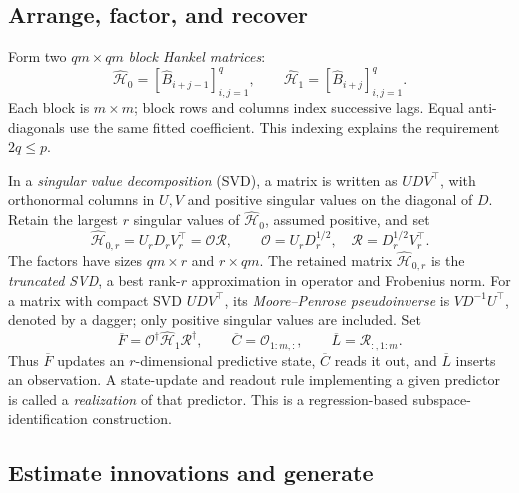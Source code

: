 \documentclass[11pt,twoside]{article}
\theoremstyle{definition}
\theoremstyle{remark}
\begin{document}
\subsection{Arrange, factor, and recover}
\label{sec:hankel}

Form two \(qm\times qm\) \emph{block Hankel matrices}:
\begin{equation}
 \widehat{\mathcal H}_0=[\widehat B_{i+j-1}]_{i,j=1}^q,\qquad
 \widehat{\mathcal H}_1=[\widehat B_{i+j}]_{i,j=1}^q .
 \label{eq:estimated-hankel}
\end{equation}
Each block is \(m\times m\); block rows and columns index successive
lags. Equal anti-diagonals use the same fitted coefficient.
This indexing explains the requirement \(2q\le p\).

In a \emph{singular value decomposition} (SVD), a matrix is written as
\(UDV^\top\), with orthonormal columns in \(U,V\) and positive singular
values on the diagonal of \(D\). Retain the largest \(r\) singular values
of \(\widehat{\mathcal H}_0\), assumed positive, and set
\[
 \widehat{\mathcal H}_{0,r}=U_rD_rV_r^\top
   =\mathcal O\mathcal R,\qquad
 \mathcal O=U_rD_r^{1/2},\quad
 \mathcal R=D_r^{1/2}V_r^\top .
\]
The factors have sizes \(qm\times r\) and \(r\times qm\).
The retained matrix \(\widehat{\mathcal H}_{0,r}\) is the \emph{truncated
SVD}, a best rank-\(r\) approximation in operator and Frobenius norm.
For a matrix with compact SVD \(UDV^\top\), its \emph{Moore--Penrose
pseudoinverse} is \(VD^{-1}U^\top\), denoted by a dagger; only positive
singular values are included. Set
\begin{equation}
 \overline F=\mathcal O^\dagger\widehat{\mathcal H}_1\mathcal R^\dagger,
 \qquad \overline C=\mathcal O_{1:m,:},\qquad
 \overline L=\mathcal R_{:,1:m}.
 \label{eq:recover-matrices}
\end{equation}
Thus \(\overline F\) updates an \(r\)-dimensional predictive state,
\(\overline C\) reads it out, and \(\overline L\) inserts an observation.
A state-update and readout rule implementing a given predictor is called
a \emph{realization} of that predictor.
This is a regression-based subspace-identification construction.

\subsection{Estimate innovations and generate}
\label{sec:innovations-generation}
\end{document}
